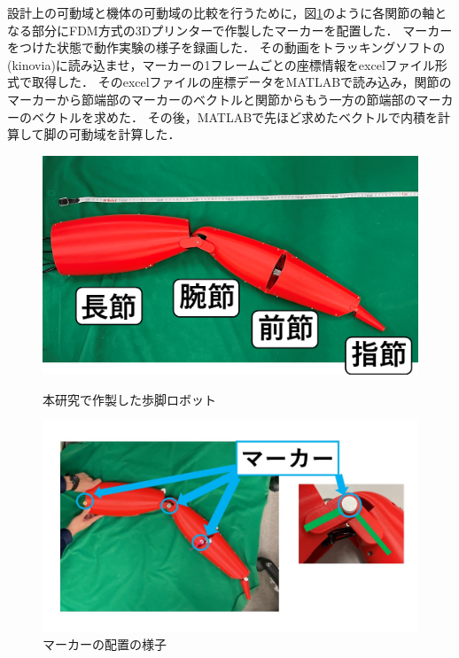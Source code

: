 設計上の可動域と機体の可動域の比較を行うために，図\ref{fig:marker_jikki}のように各関節の軸となる部分にFDM方式の3Dプリンターで作製したマーカーを配置した．
マーカーをつけた状態で動作実験の様子を録画した．
その動画をトラッキングソフトの(kinovia)に読み込ませ，マーカーの1フレームごとの座標情報をexcelファイル形式で取得した．
そのexcelファイルの座標データをMATLABで読み込み，関節のマーカーから節端部のマーカーのベクトルと関節からもう一方の節端部のマーカーのベクトルを求めた．
その後，MATLABで先ほど求めたベクトルで内積を計算して脚の可動域を計算した．
\begin{figure}[b]
    \begin{minipage}[b]{0.49\hsize}
      \centering
      \includegraphics[scale=0.2]{image/jikki_2.png}
      \caption{本研究で作製した歩脚ロボット}
      \label{fig:kanirobot_new}
    \end{minipage}
    \begin{minipage}[b]{0.49\hsize}
      \centering
      \includegraphics[scale=0.2]{image/marker.jpg}
      \caption{マーカーの配置の様子}
      \label{fig:marker_jikki}
    \end{minipage}
\end{figure}
